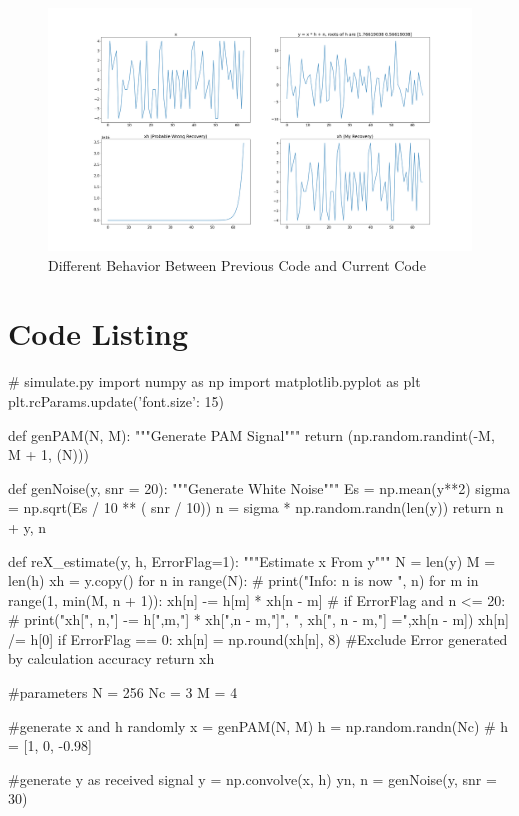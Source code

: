 \documentclass{article}
\begin{document}
\begin{appendices}
\begin{figure}[!h]
	\centering
	\includegraphics[width=6 in]{../pic/diffRec.png}
	\caption{Different Behavior Between Previous Code and Current Code}
	\label{fig:diffRec}
\end{figure}

\section{Code Listing}
\begin{python}
# simulate.py
import numpy as np
import matplotlib.pyplot as plt
plt.rcParams.update({'font.size': 15})

def genPAM(N, M):
    """Generate PAM Signal"""
    return (np.random.randint(-M, M + 1, (N)))

def genNoise(y, snr = 20):
    """Generate White Noise"""
    Es = np.mean(y**2)
    sigma = np.sqrt(Es / 10 ** ( snr / 10))
    n = sigma * np.random.randn(len(y))
    return n + y, n

def reX_estimate(y, h, ErrorFlag=1):
    """Estimate x From y"""
    N = len(y)
    M = len(h)
    xh = y.copy()
    for n in range(N):
        # print("Info: n is now ", n)
        for m in range(1, min(M, n + 1)):
            xh[n] -= h[m] * xh[n - m]
            # if ErrorFlag and n <= 20:
            #     print("xh[", n,"] -= h[",m,"] * xh[",n - m,"]", ", xh[", n - m,"] =",xh[n - m])
        xh[n] /= h[0]
        if ErrorFlag == 0:
            xh[n] = np.round(xh[n], 8) #Exclude Error generated by calculation accuracy
    return xh

#parameters
N = 256
Nc = 3
M = 4

#generate x and h randomly
x = genPAM(N, M)
h = np.random.randn(Nc)
# h = [1, 0, -0.98]

#generate y as received signal
y = np.convolve(x, h)
yn, n = genNoise(y, snr = 30) 


\end{python}
\end{appendices}
\end{document}
